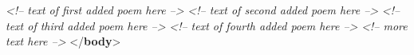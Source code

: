 \begin{shaded}
\mbox{}\newline 
\textit{<!-- text of first added poem here -->}\mbox{}\newline 
{}\mbox{}\newline 
{}\mbox{}\newline 
\textit{<!-- text of second added poem here -->}\mbox{}\newline 
{}\mbox{}\newline 
{}\mbox{}\newline 
\textit{<!-- text of third added poem here -->}\mbox{}\newline 
{}\mbox{}\newline 
{}\mbox{}\newline 
\textit{<!-- text of fourth added poem here -->}\mbox{}\newline 
{}\mbox{}\newline 
{}\mbox{}\newline 
{}\mbox{}\newline 
\textit{<!-- more text here -->}\mbox{}\newline 
{}\mbox{}\newline 
{</\textbf{body}>}\end{shaded}\egroup\par \par
